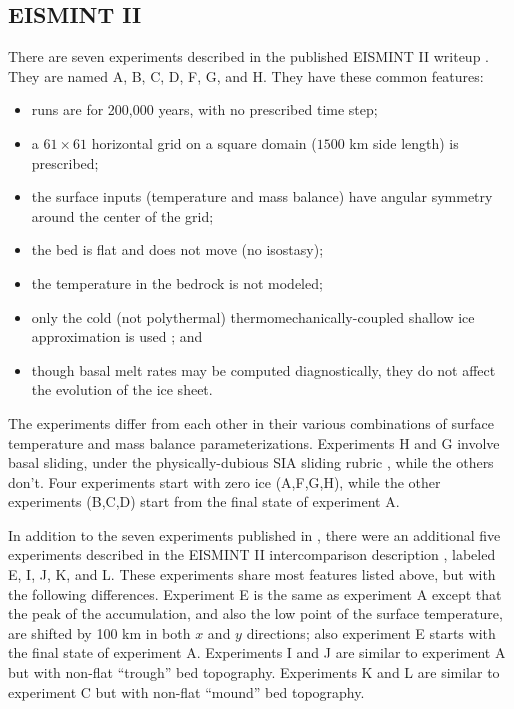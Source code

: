 \documentclass[11pt,final]{amsart}
\begin{document}
\subsection{EISMINT II}\label{subsect:EISMINTII}  There are seven experiments described in the published EISMINT II writeup \cite{EISMINT00}.  They are named A, B, C, D, F, G, and H.  They have these common features:\begin{itemize}
\item runs are for 200,000 years, with no prescribed time step;
\item a $61\times 61$ horizontal grid on a square domain ($1500$ km side length) is prescribed;
\item the surface inputs (temperature and mass balance) have angular symmetry around the center of the grid;
\item the bed is flat and does not move (no isostasy);
\item the temperature in the bedrock is not modeled;
\item only the cold (not polythermal) thermomechanically-coupled shallow ice approximation is used \cite{EISMINT00}; and
\item though basal melt rates may be computed diagnostically, they do not affect the evolution of the ice sheet.
\end{itemize}
The experiments differ from each other in their various combinations of surface temperature and mass balance parameterizations.  Experiments H and G involve basal sliding, under the physically-dubious SIA sliding rubric \cite[Appendix B]{BBssasliding}, while the others don't.  Four experiments start with zero ice (A,F,G,H), while the other experiments (B,C,D) start from the final state of experiment A.

In addition to the seven experiments published in \cite{EISMINT00}, there were an additional five experiments described in the EISMINT II intercomparison description 
\cite{EISIIdescribe}, labeled E, I, J, K, and L.  These experiments share most features listed above, but with the following differences.  Experiment E is the same as experiment A except that the peak of the accumulation, and also the low point of the surface temperature, are shifted by 100 km in both $x$ and $y$ directions; also experiment E starts with the final state of experiment A.  Experiments I and J are similar to experiment A but with non-flat ``trough'' bed topography.  Experiments K and L are similar to experiment C but with non-flat ``mound'' bed topography.
\end{document}
